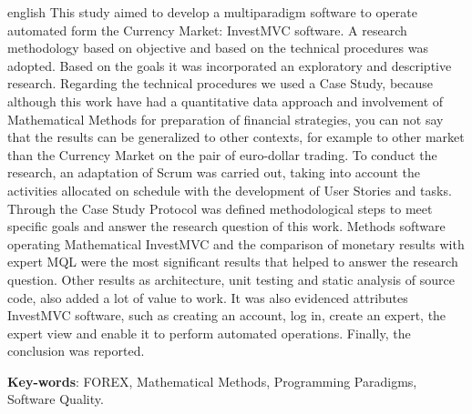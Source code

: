 \begin{resumo}[Abstract]
 \begin{otherlanguage*}{english}
This study aimed to develop a multiparadigm software to operate automated form the Currency Market: InvestMVC software. A research methodology based on objective and based on the technical procedures was adopted. Based on the goals it was incorporated an exploratory and descriptive research. Regarding the technical procedures we used a Case Study, because although this work have had a quantitative data approach and involvement of Mathematical Methods for preparation of financial strategies, you can not say that the results can be generalized to other contexts, for example to other market than the Currency Market on the pair of euro-dollar trading. To conduct the research, an adaptation of Scrum was carried out, taking into account the activities allocated on schedule with the development of User Stories and tasks. Through the Case Study Protocol was defined methodological steps to meet specific goals and answer the research question of this work. Methods software operating Mathematical InvestMVC and the comparison of monetary results with expert MQL were the most significant results that helped to answer the research question. Other results as architecture, unit testing and static analysis of source code, also added a lot of value to work. It was also evidenced attributes InvestMVC software, such as creating an account, log in, create an expert, the expert view and enable it to perform automated operations. Finally, the conclusion was reported.
   \vspace{\onelineskip}
 
   \noindent
   \textbf{Key-words}: FOREX, Mathematical Methods, Programming Paradigms, Software Quality.
 \end{otherlanguage*}
\end{resumo}
